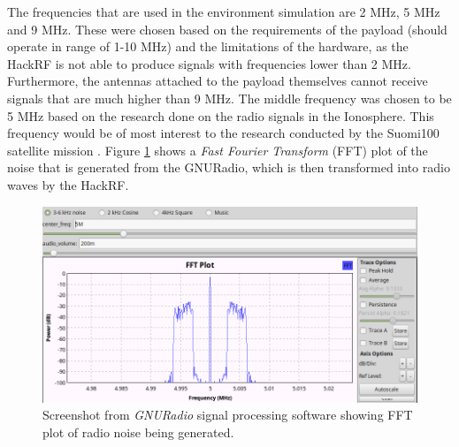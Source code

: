 \documentclass[english,12pt,a4paper,pdftex,elec,utf8]{aaltothesis}
\begin{document}
The frequencies that are used in the environment simulation are 2 MHz, 5 MHz and 9 MHz. These were chosen based on the requirements of the payload (should operate in range of 1-10 MHz) and the limitations of the hardware, as the HackRF is not able to produce signals with frequencies  lower than 2 MHz. Furthermore, the antennas attached to the payload themselves cannot receive signals that are much higher than 9 MHz. The middle frequency was chosen to be 5 MHz based on the research done on the radio signals in the Ionosphere. This frequency would be of most interest to the research conducted by the Suomi100 satellite mission \cite{esanpapru}. 
Figure \ref{gnuradio} shows a \textit{Fast Fourier Transform} (FFT) plot of the noise that is generated from the GNURadio, which is then transformed into radio waves by the HackRF.\par
\begin{figure}[h!]
\centering
\includegraphics[scale=0.45]{Test_window}
\caption{Screenshot from \textit{GNURadio} signal processing software showing FFT plot of radio noise being generated.}
\label{gnuradio}
\end{figure}  
\end{document}
